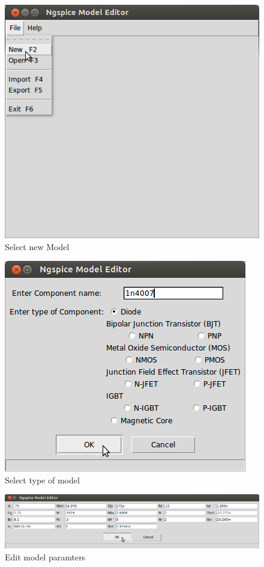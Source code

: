 \begin{figure}[t]%
\begin{center}
\includegraphics[width=0.4\linewidth]{figures/new-model-0.png}%
\caption{Select new Model}
\label{new}
\end{center}
\end{figure} 

\begin{figure}[t]%
\begin{center}
\includegraphics[width=0.8\linewidth]{figures/select-mod-type.png}%
\caption{Select type of model}
\label{select}
\end{center}
\end{figure} 

\begin{figure}[t]%
\begin{center}
\includegraphics[width=1\linewidth]{figures/model-parameters.png}%
\caption{Edit model paramters}
\label{edit}
\end{center}
\end{figure}

